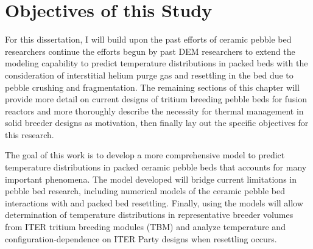 \section{Objectives of this Study}\label{sec:intro-scope-of-work}
For this dissertation, I will build upon the past efforts of ceramic pebble bed researchers continue the efforts begun by past DEM researchers to extend the modeling capability to predict temperature distributions in packed beds with the consideration of interstitial helium purge gas and resettling in the bed due to pebble crushing and fragmentation. The remaining sections of this chapter will provide more detail on current designs of tritium breeding pebble beds for fusion reactors and more thoroughly describe the necessity for thermal management in solid breeder designs as motivation, then finally lay out the specific objectives for this research.






The goal of this work is to develop a more comprehensive model to predict temperature distributions in packed ceramic pebble beds that accounts for many important phenomena. The model developed will bridge current limitations in pebble bed research, including numerical models of the ceramic pebble bed interactions with and packed bed resettling. Finally, using the models will allow determination of temperature distributions in representative breeder volumes from ITER tritium breeding modules (TBM) and analyze temperature and configuration-dependence on ITER Party designs when resettling occurs.

